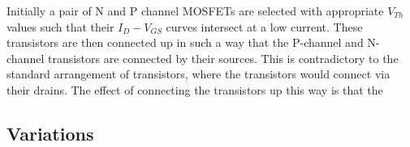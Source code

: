 Initially a pair of N and P channel MOSFETs are selected with appropriate $V_{Th}$ values such that their $I_{D}-V_{GS}$ curves intersect at a low current.
These transistors are then connected up in such a way that the P-channel and N-channel transistors are connected by their sources.
This is contradictory to the standard arrangement of transistors, where the transistors would connect via their drains.
The effect of connecting the transistors up this way is that the


\subsection{Variations}

